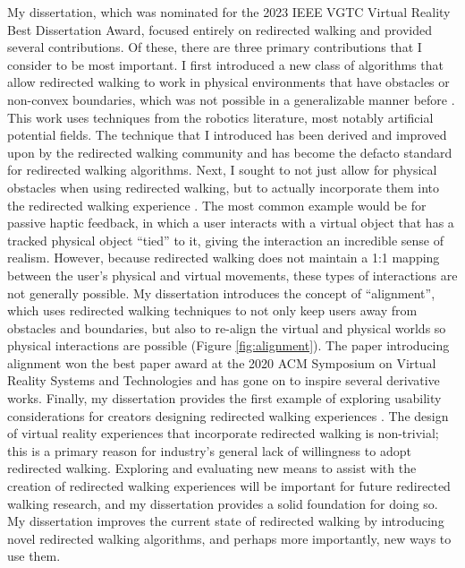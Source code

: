 My dissertation, which was nominated for the 2023 IEEE VGTC Virtual Reality Best Dissertation Award, focused entirely on redirected walking and provided several contributions. Of these, there are three primary contributions that I consider to be most important. I first introduced a new class of algorithms that allow redirected walking to work in physical environments that have obstacles or non-convex boundaries, which was not possible in a generalizable manner before \cite{thomas2019general}. This work uses techniques from the robotics literature, most notably artificial potential fields. The technique that I introduced has been derived and improved upon by the redirected walking community and has become the defacto standard for redirected walking algorithms. Next, I sought to not just allow for physical obstacles when using redirected walking, but to actually incorporate them into the redirected walking experience \cite{thomas2020towards, thomas2020reactive, thomas2022inverse}. The most common example would be for passive haptic feedback, in which a user interacts with a virtual object that has a tracked physical object ``tied'' to it, giving the interaction an incredible sense of realism. However, because redirected walking does not maintain a 1:1 mapping between the user's physical and virtual movements, these types of interactions are not generally possible. My dissertation introduces the concept of ``alignment'', which uses redirected walking techniques to not only keep users away from obstacles and boundaries, but also to re-align the virtual and physical worlds so physical interactions are possible (Figure \ref{fig:alignment}). The paper introducing alignment won the best paper award at the 2020 ACM Symposium on Virtual Reality Systems and Technologies and has gone on to inspire several derivative works. Finally, my dissertation provides the first example of exploring usability considerations for creators designing redirected walking experiences \cite{thomas2022inverse}. The design of virtual reality experiences that incorporate redirected walking is non-trivial; this is a primary reason for industry's general lack of willingness to adopt redirected walking. Exploring and evaluating new means to assist with the creation of redirected walking experiences will be important for future redirected walking research, and my dissertation provides a solid foundation for doing so. My dissertation improves the current state of redirected walking by introducing novel redirected walking algorithms, and perhaps more importantly, new ways to use them.

